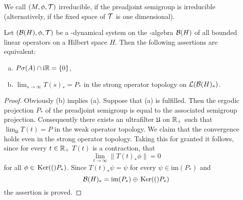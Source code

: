 We call $ (M,\phi,\mathcal{T}) $  irreducible, if the preadjoint semigroup is irreducible (alternatively, if the fixed space of $ \mathcal{T} $  is one dimensional).
\begin{proposition}\label{prop:d4-3.7}
Let $ (\mathcal{B}(H),\phi,\mathcal{T}) $  be a \WA-dynamical system on the \WA-algebra $ \mathcal{B}(H) $  of all bounded linear operators on a Hilbert space $ H $.
Then the following assertions are equivalent:
\begin{enumerate}[(a)]
\item
$ P\sigma(A) \cap \mathrm{i}\mathbb{R} = \{0\} $,

\item
$ \lim_{s \to \infty} T(s)_{*} = P_{*} $  in the strong operator topology on $ \mathcal{L}(\mathcal{B}(H)_{*}) $.
\end{enumerate}
\end{proposition}
\begin{proof}
Obviously (b) implies (a).
Suppose that (a) is fulfilled.
Then the ergodic projection $ P_{*} $  of the preadjoint semigroup is equal to the associated semigroup projection.
Consequently there exists an ultrafilter $ \mathfrak{U} $  on $ \mathbb{R}_{+} $  such that $ \lim_{\mathfrak{U}} T(t) = P $  in the weak operator topology.
We claim that the convergence holds even in the strong operator topology.
Taking this for granted it follows, since for every $ t \in \mathbb{R}_{+} $  $ T(t) $  is a contraction, that
\[
\lim_{t \to \infty} \|T(t)_{*}\phi\| = 0
\]
for all $ \phi \in \mathop{}\mathrm{Ker}(()P_{*}) $.
Since $ T(t)_{*}\psi = \psi $  for every $ \psi \in \text{im}(P_{*}) $  and
\[
\mathcal{B}(H)_{*} = \text{im}(P_{*}) \oplus \mathop{}\mathrm{Ker}(()P_{*})
\]
the assertion is proved.


\end{proof}
